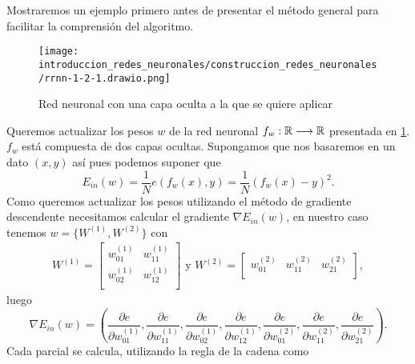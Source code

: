 Mostraremos un ejemplo primero antes de presentar el método general para facilitar la comprensión del algoritmo. 
\begin{figure}[h!]
    \texttt{[image: introduccion\_redes\_neuronales/construccion\_redes\_neuronales/rrnn-1-2-1.drawio.png]}
    \caption{Red neuronal con una capa oculta a la que se quiere aplicar }
    \label{img:construccion_rrnn:rrnn-1-2-1}
\end{figure} 
Queremos actualizar los pesos $w$ de la red neuronal 
$f_w : \mathbb{R} \longrightarrow \mathbb{R}$ presentada en \ref{img:construccion_rrnn:rrnn-1-2-1}.
$f_w$ está compuesta de dos capas ocultas. Supongamos que nos basaremos en un dato 
$(x, y)$ así pues podemos suponer que 
\begin{equation}
    E_{in}(w) = \frac{1}{N}e(f_w(x), y) = \frac{1}{N} (f_w(x)- y)^2.
\end{equation}
Como queremos actualizar los pesos utilizando el método de gradiente descendente necesitamos calcular el gradiente $\nabla E_{in}(w)$, en nuestro caso tenemos $w=\{W^{(1)}, W^{(2)}\}$ con 
\begin{align}
    W^{(1)} = 
    \begin{bmatrix}
        w^{(1)}_{01} & w^{(1)}_{11} \\
        w^{(1)}_{02} & w^{(1)}_{12} \\
    \end{bmatrix} 
    \text{ y }
    W^{(2)} = 
    \begin{bmatrix}
        w^{(2)}_{01} & w^{(2)}_{11} & w^{(2)}_{21}\\
    \end{bmatrix}, 
\end{align}
luego 
\begin{equation}
    \nabla E_{in}(w) = 
    \left(
        \frac{\partial e}{\partial w^{(1)}_{01}},
        \frac{\partial e}{\partial w^{(1)}_{11}},
        \frac{\partial e}{\partial w^{(1)}_{02}},
        \frac{\partial e}{\partial w^{(1)}_{12}},
        \frac{\partial e}{\partial w^{(2)}_{01}},
        \frac{\partial e}{\partial w^{(2)}_{11}},
        \frac{\partial e}{\partial w^{(2)}_{21}}
    \right).
\end{equation} 
Cada parcial se calcula, utilizando la regla de la cadena como
